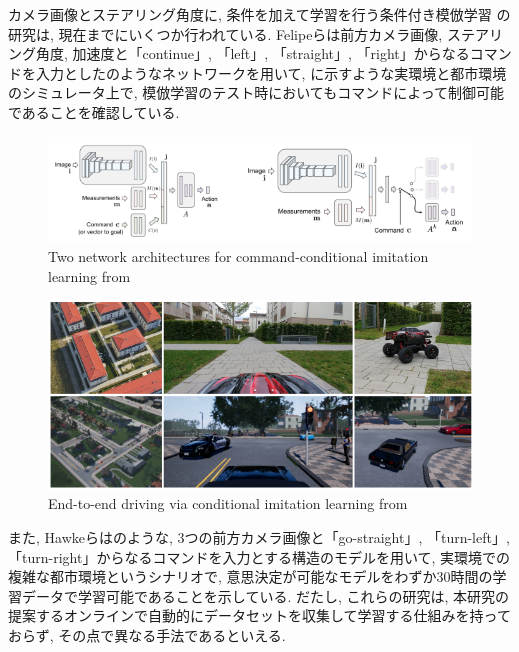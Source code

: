 カメラ画像とステアリング角度に, 条件を加えて学習を行う条件付き模倣学習
の研究は, 現在までにいくつか行われている.
Felipeら\cite{felipe}は前方カメラ画像, ステアリング角度, 加速度と「continue」, 「left」, 「straight」, 「right」からなるコマンドを入力としたのようなネットワークを用いて, に示すような実環境と都市環境のシミュレータ上で, 模倣学習のテスト時においてもコマンドによって制御可能であることを確認している.

\vspace{0.5cm}

\begin{figure}[hbtp]
     \centering
    \includegraphics[keepaspectratio, scale=0.65]
         {images/felipe_network.png}
    \caption{Two network architectures for command-conditional imitation learning from \cite{felipe}}
    \label{Fig:felipe_network}
\end{figure}

\vspace{0.5cm}

\begin{figure}[hbtp]
     \centering
    \includegraphics[keepaspectratio, scale=0.57]
         {images/felipe.png}
    \caption{End-to-end driving via conditional imitation learning from \cite{felipe}}
    \label{Fig:felipe}
\end{figure}

\newpage

また, Hawkeら\cite{hawke}はのような, 3つの前方カメラ画像と「go-straight」, 「turn-left」, 「turn-right」からなるコマンドを入力とする構造のモデルを用いて, 実環境での複雑な都市環境というシナリオで, 意思決定が可能なモデルをわずか30時間の学習データで学習可能であることを示している.
だたし, これらの研究は, 本研究の提案するオンラインで自動的にデータセットを収集して学習する仕組みを持っておらず, その点で異なる手法であるといえる.

